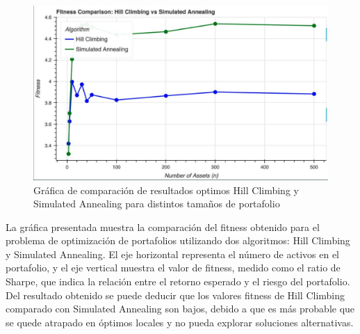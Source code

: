 \documentclass[9pt,a4paper,twoside]{rho-class/rho}
\begin{document}
        \begin{figure}[h]
            \centering
            \includegraphics[width=\linewidth]{figures/exe_fitness.pdf}
            \caption{Gráfica de comparación de resultados optimos Hill Climbing y Simulated Annealing para distintos tamaños de portafolio}
            \label{fig:sample_figure}
        \end{figure}

        La gráfica presentada muestra la comparación del fitness obtenido para el problema de optimización de portafolios utilizando dos algoritmos: Hill Climbing y Simulated Annealing. El eje horizontal representa el número de activos en el portafolio, y el eje vertical muestra el valor de fitness, medido como el ratio de Sharpe, que indica la relación entre el retorno esperado y el riesgo del portafolio. Del resultado obtenido se puede deducir que los valores fitness de Hill Climbing comparado con Simulated Annealing son bajos, debido a que es más probable que se quede atrapado en óptimos locales y no pueda explorar soluciones alternativas.
        



\end{document}
